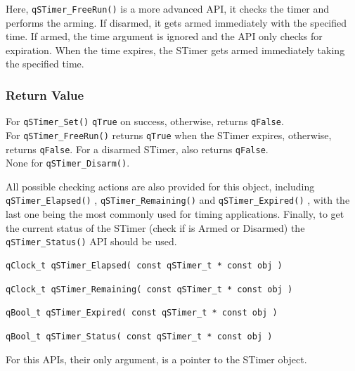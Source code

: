 \documentclass{article}
\begin{document}
Here, \lstinline{qSTimer_FreeRun()} is a more advanced API, it checks the timer and performs the arming. If disarmed, it gets armed immediately with the specified time. If armed, the time argument is ignored and the API only checks for expiration. When the time expires, the STimer gets armed immediately taking the specified time.

\subsubsection*{Return Value}
For \lstinline{qSTimer_Set()} \lstinline{qTrue} on success, otherwise, returns \lstinline{qFalse}.\\
For \lstinline{qSTimer_FreeRun()} returns \lstinline{qTrue} when the STimer expires, otherwise, returns \lstinline{qFalse}. For a disarmed STimer, also returns \lstinline{qFalse}. \\
None for \lstinline{qSTimer_Disarm()}.

\noindent\hrulefill
\newline
All possible checking actions are also provided for this object, including \lstinline{qSTimer_Elapsed()} , \lstinline{qSTimer_Remaining()}  and \lstinline{qSTimer_Expired()} , with the last one being the most commonly used for timing applications.
Finally, to get the current status of the STimer (check if is Armed or Disarmed) the \lstinline{qSTimer_Status()}  API should be used. \\

\begin{lstlisting}[style=CStyle]
qClock_t qSTimer_Elapsed( const qSTimer_t * const obj )
\end{lstlisting}

\begin{lstlisting}[style=CStyle]
qClock_t qSTimer_Remaining( const qSTimer_t * const obj )
\end{lstlisting}

\begin{lstlisting}[style=CStyle]
qBool_t qSTimer_Expired( const qSTimer_t * const obj )
\end{lstlisting}

\begin{lstlisting}[style=CStyle]
qBool_t qSTimer_Status( const qSTimer_t * const obj )
\end{lstlisting}

For this APIs, their only argument, is a pointer to the STimer object.
\end{document}
